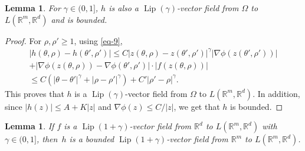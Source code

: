 \documentclass[a4paper,12pt]{article}
\newtheorem{lemma}[theorem]{Lemma}
\theoremstyle{definition}
\newcommand{\RR}{\mathbb{R}}
\DeclareMathOperator{\Lip}{Lip}
\begin{document}
\begin{lemma}
\label{lem-1}
For $\gamma\in(0,1]$, $h$ is also a $\Lip(\gamma)$-vector field from $\Omega$ to $L(\RR^m,\RR^d)$
and is bounded.
\end{lemma}

\begin{proof}
For $\rho,\rho'\geq 1$, using \eqref{eq-9}, 
\begin{multline*}
|h(\theta,\rho)-h(\theta',\rho')|
\leq C|z(\theta,\rho)-z(\theta',\rho')|^\gamma|\nabla \phi(z(\theta',\rho'))|\\
+|\nabla \phi(z(\theta,\rho))-\nabla \phi(\theta',\rho')|\cdot
|f(z(\theta,\rho))|\\
\leq C(|\theta-\theta'|^\gamma+|\rho-\rho'|^\gamma)
+C'|\rho'-\rho|^\gamma.
\end{multline*}
This proves that $h$ is a $\Lip(\gamma)$-vector field from $\Omega$ to $L(\RR^m,\RR^d)$.
In addition, 
since $|h(z)|\leq A+K|z|$ and $\nabla\phi(z)\leq C/|z|$, 
we get that $h$ is bounded.
\end{proof}

\begin{lemma}
\label{lem-2}
If $f$ is a $\Lip(1+\gamma)$-vector field from $\RR^d$ to $L(\RR^m,\RR^d)$ with $\gamma\in(0,1]$,
then~$h$ is a bounded $\Lip(1+\gamma)$-vector field from $\RR^m$ to $L(\RR^m,\RR^d)$.
\end{lemma}
\end{document}
